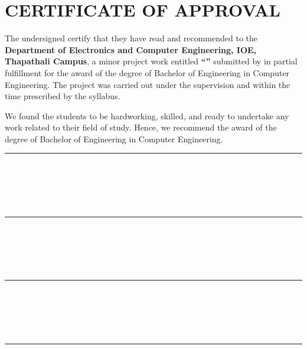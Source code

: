 \chapter*{CERTIFICATE OF APPROVAL}
{}

\noindent The undersigned certify that they have read and recommended to the
\textbf{Department of Electronics and Computer Engineering, IOE, Thapathali Campus},
a minor project work entitled \textbf{``\cTitle''} submitted by
\textbf{\authorList} in partial fulfillment for the award of the degree of
Bachelor of Engineering in Computer Engineering.
The project was carried out under the supervision and within the time
prescribed by the syllabus.

\vspace{1em}

We found the students to be hardworking, skilled, and ready to undertake
any work related to their field of study. Hence, we recommend the award
of the degree of Bachelor of Engineering in Computer Engineering.

\vspace{2em}

\noindent
\begin{minipage}[t]{0.48\textwidth}
    \rule{6cm}{0.4pt} \\
    \cSupervisorTitle \\
    \cSupervisor \\
    \cSupervisorDept \\
    \cSupervisorAddress
\end{minipage}
\hfill
\begin{minipage}[t]{0.48\textwidth}
    \rule{6cm}{0.4pt} \\
    \cExternalExaminerTitle \\
    \cExternalExaminer \\
    \cExternalExaminerDept \\
    \cExternalExaminerAddress
\end{minipage}

\vspace{3em}

\noindent
\begin{minipage}[t]{0.48\textwidth}
    \rule{6cm}{0.4pt} \\
    \cProjectCoordinatorTitle \\
    \cProjectCoordinator \\
    \cProjectCoordinatorDept \\
    \cProjectCoordinatorAddress
\end{minipage}
\hfill
\begin{minipage}[t]{0.48\textwidth}
    \rule{6cm}{0.4pt} \\
    \cHODTitle \\
    \cHOD \\
    \cHODDept \\
    \cHODAddress
\end{minipage}

\vspace{2em}

\noindent \cDate
